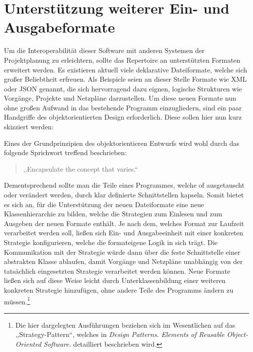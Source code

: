 \section{Unterst\"utzung weiterer Ein- und Ausgabeformate}

Um die Interoperabilit\"at dieser Software mit anderen Systemen der
Projektplanung zu erleichtern, sollte das Repertoire an
unterst\"utzten Formaten erweitert werden. Es existieren aktuell viele
deklarative Dateiformate, welche sich gro{\ss}er Beliebtheit
erfreuen. Als Beispiele seien an dieser Stelle Formate wie XML oder
JSON genannt, die sich hervorragend dazu eignen, logische Strukturen
wie Vorg\"ange, Projekte und Netzpl\"ane darzustellen. Um diese neuen
Formate nun ohne gro{\ss}en Aufwand in das bestehende Programm
einzugliedern, sind ein paar Handgriffe des objektorientierten Design
erforderlich. Diese sollen hier nun kurz skizziert werden:

Eines der Grundprinzipien des objektorientieren Entwurfs wird wohl
durch das folgende Sprichwort treffend beschrieben:
\begin{quotation}
,,Encapsulate the concept that varies.``
\end{quotation}
Dementsprechend sollte man die Teile eines Programmes, welche of
ausgetauscht oder ver\"andert werden, durch klar definierte
Schnittstellen kapseln. Somit bietet es sich an, f\"ur die
Unterst\"utzung der neuen Dateiformate eine neue Klassenhierarchie zu
bilden, welche die Strategien zum Einlesen und zum Ausgeben der neuen
Formate enth\"alt. Je nach dem, welches Format zur Laufzeit
verarbeitet werden soll, lie{\ss}en sich Ein- und Ausgabeeinheit mit
einer konkreten Strategie konfigurieren, welche die formateigene Logik
in sich tr\"agt. Die Kommunikation mit der Strategie w\"urde dann
\"uber die feste Schnittstelle einer abstrakten Klasse ablaufen, damit
Vorg\"ange und Netzpl\"ane unabh\"angig von der tats\"achlich
eingesetzten Strategie
verarbeitet werden k\"onnen. Neue Formate lie{\ss}en sich auf diese
Weise leicht durch Unterklassenbildung einer weiteren konkreten
Strategie hinzuf\"ugen, ohne andere Teile des Programms \"andern zu
m\"ussen.\footnote{Die hier dargelegten Ausf\"uhrungen beziehen sich
  im Wesentlichen auf das ,,Strategy-Pattern``, welches in
  \textit{Design Patterns. Elements of Reusable Object-Oriented
    Software.} detailliert beschrieben wird.}

